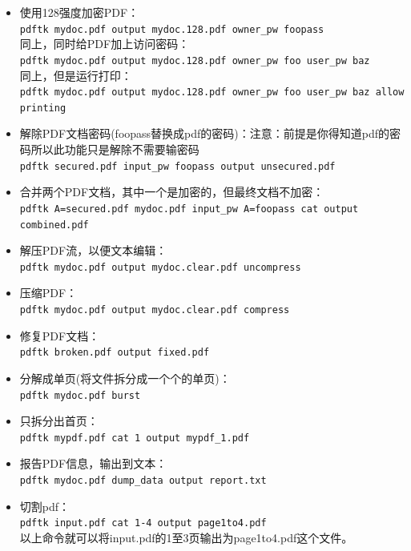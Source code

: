 {\begin{itemize}
\item 使用128强度加密PDF：\\
\verb|pdftk mydoc.pdf output mydoc.128.pdf owner_pw foopass|\\
同上，同时给PDF加上访问密码：\\
\verb|pdftk mydoc.pdf output mydoc.128.pdf owner_pw foo user_pw baz|\\
同上，但是运行打印：\\
\verb|pdftk mydoc.pdf output mydoc.128.pdf owner_pw foo user_pw baz allow printing|

\item
解除PDF文档密码(foopass替换成pdf的密码)：注意：前提是你得知道pdf的密码所以此功能只是解除不需要输密码\\
\verb|pdftk secured.pdf input_pw foopass output unsecured.pdf|

\item
合并两个PDF文档，其中一个是加密的，但最终文档不加密：\\
\verb|pdftk A=secured.pdf mydoc.pdf input_pw A=foopass cat output combined.pdf|

\item 解压PDF流，以便文本编辑：\\
\verb|pdftk mydoc.pdf output mydoc.clear.pdf uncompress|

\item 
压缩PDF：\\
\verb|pdftk mydoc.pdf output mydoc.clear.pdf compress|

\item 
修复PDF文档：\\
\verb|pdftk broken.pdf output fixed.pdf|

\item
分解成单页(将文件拆分成一个个的单页)：\\
\verb|pdftk mydoc.pdf burst|

\item 只拆分出首页：\\
\verb|pdftk mypdf.pdf cat 1 output mypdf_1.pdf|

\item 报告PDF信息，输出到文本：\\
\verb|pdftk mydoc.pdf dump_data output report.txt|

\item 切割pdf：\\
\verb|pdftk input.pdf cat 1-4 output page1to4.pdf|\\
以上命令就可以将input.pdf的1至3页输出为page1to4.pdf这个文件。
\end{itemize}

}
